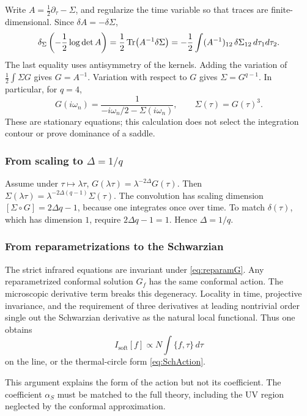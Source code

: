 \documentclass[11pt]{article}
\numberwithin{equation}{section}
\theoremstyle{exposition}
\theoremstyle{result}
\begin{document}
Write $A=\tfrac12\partial_\tau-\Sigma$, and regularize the time variable so that traces are finite-dimensional. Since $\delta A=-\delta\Sigma$,
\begin{equation*}
\delta_\Sigma\left(-\frac12\log\det A\right)
=\frac12\Tr(A^{-1}\delta\Sigma)
=-\frac12\int (A^{-1})_{12}\,\delta\Sigma_{12}\,d\tau_1d\tau_2.
\end{equation*}
The last equality uses antisymmetry of the kernels. Adding the variation of $\tfrac12\int\Sigma G$ gives $G=A^{-1}$. Variation with respect to $G$ gives $\Sigma=G^{q-1}$. In particular, for $q=4$,
\begin{equation*}
G(i\omega_n)=\frac1{-i\omega_n/2-\Sigma(i\omega_n)},
\qquad \Sigma(\tau)=G(\tau)^3.
\end{equation*}
These are stationary equations; this calculation does not select the integration contour or prove dominance of a saddle.

\subsubsection{From scaling to $\Delta=1/q$}

Assume under $\tau\mapsto \lambda\tau$, $G(\lambda\tau)=\lambda^{-2\Delta}G(\tau)$. Then $\Sigma(\lambda\tau)=\lambda^{-2\Delta(q-1)}\Sigma(\tau)$. The convolution has scaling dimension $[\Sigma\circ G]=2\Delta q-1$, because one integrates once over time. To match $\delta(\tau)$, which has dimension $1$, require $2\Delta q-1=1$. Hence $\Delta=1/q$.

\subsubsection{From reparametrizations to the Schwarzian}

The strict infrared equations are invariant under \eqref{eq:reparamG}. Any reparametrized conformal solution $G_f$ has the same conformal action. The microscopic derivative term breaks this degeneracy. Locality in time, projective invariance, and the requirement of three derivatives at leading nontrivial order single out the Schwarzian derivative as the natural local functional. Thus one obtains
\begin{equation*}
I_{\mathrm{soft}}[f]
\propto N\int\{f,\tau\}\,d\tau
\end{equation*}
on the line, or the thermal-circle form \eqref{eq:SchAction}.

This argument explains the form of the action but not its coefficient. The coefficient $\alpha_S$ must be matched to the full theory, including the UV region neglected by the conformal approximation.
\end{document}
